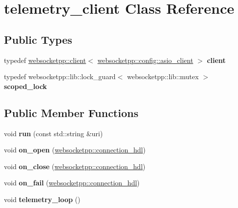 \hypertarget{classtelemetry__client}{}\section{telemetry\+\_\+client Class Reference}
\label{classtelemetry__client}
\subsection*{Public Types}
\begin{DoxyCompactItemize}
\item 
\mbox{\label{classtelemetry__client_a57c0d5f224b12937b76bc6ed9df04d00}} 
typedef \mbox{\hyperlink{classwebsocketpp_1_1client}{websocketpp\+::client}}$<$ \mbox{\hyperlink{structwebsocketpp_1_1config_1_1asio__client}{websocketpp\+::config\+::asio\+\_\+client}} $>$ {\bfseries client}
\item 
\mbox{\label{classtelemetry__client_a4ca4c66f8af26fef4940e42c4c7afafe}} 
typedef websocketpp\+::lib\+::lock\+\_\+guard$<$ websocketpp\+::lib\+::mutex $>$ {\bfseries scoped\+\_\+lock}
\end{DoxyCompactItemize}
\subsection*{Public Member Functions}
\begin{DoxyCompactItemize}
\item 
\mbox{\label{classtelemetry__client_aa5765b95b628b04bbe403cf022d0f014}} 
void {\bfseries run} (const std\+::string \&uri)
\item 
\mbox{\label{classtelemetry__client_a0174e58d0e5417888581372e452a62c2}} 
void {\bfseries on\+\_\+open} (\mbox{\hyperlink{namespacewebsocketpp_a6b3d26a10ee7229b84b776786332631d}{websocketpp\+::connection\+\_\+hdl}})
\item 
\mbox{\label{classtelemetry__client_a0181996f0d5d519c09aee2878ab2b0c3}} 
void {\bfseries on\+\_\+close} (\mbox{\hyperlink{namespacewebsocketpp_a6b3d26a10ee7229b84b776786332631d}{websocketpp\+::connection\+\_\+hdl}})
\item 
\mbox{\label{classtelemetry__client_ae63630bbc931ce9d5e7047e65eac19db}} 
void {\bfseries on\+\_\+fail} (\mbox{\hyperlink{namespacewebsocketpp_a6b3d26a10ee7229b84b776786332631d}{websocketpp\+::connection\+\_\+hdl}})
\item 
\mbox{\label{classtelemetry__client_acc925f9ef40b46fdfb040b9325c67ae2}} 
void {\bfseries telemetry\+\_\+loop} ()
\end{DoxyCompactItemize}


